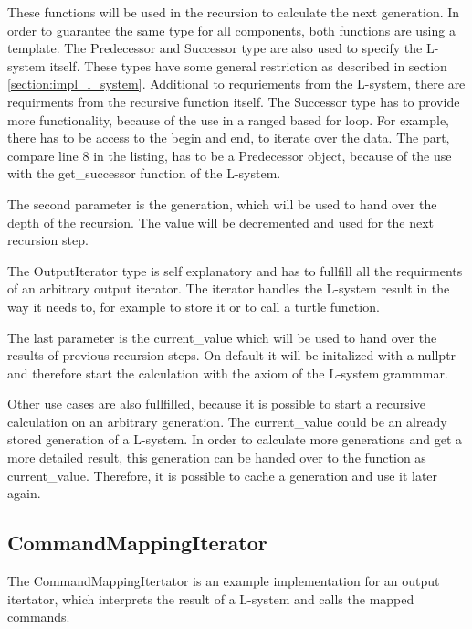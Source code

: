 \documentclass[english]{cpp-hmwk}
\begin{document}
\noindent These functions will be used in the recursion to calculate the next generation. In order to guarantee the same type for all components, both functions are using a template. The Predecessor and Successor type are also used to specify the L-system itself. These types have some general restriction as described in section \ref{section:impl_l_system}.\newline
Additional to requriements from the L-system, there are requirments from the recursive function itself.  The Successor type has to provide more functionality, because of the use in a ranged based for loop. For example, there has to be access to the begin and end, to iterate over the data. The part, compare line 8 in the listing, has to be a Predecessor object, because of the use with the get\_successor function of the L-system.

The second parameter is the generation, which will be used to hand over the depth of the recursion. The value will be decremented and used for the next recursion step.

The OutputIterator type is self explanatory and has to fullfill all the requirments of an arbitrary output iterator. The iterator handles the L-system result in the way it needs to, for example to store it or to call a turtle function.

The last parameter is the current\_value which will be used to hand over the results of previous recursion steps. On default it will be initalized with a nullptr and therefore start the calculation with the axiom of the L-system grammmar.

Other use cases are also fullfilled, because it is possible to start a recursive calculation on an arbitrary generation. The current\_value could be an already stored generation of a L-system. In order to calculate more generations and get a more detailed result, this generation can be handed over to the function as current\_value. Therefore, it is possible to cache a generation and use it later again.

\subsection{CommandMappingIterator}

The CommandMappingItertator is an example implementation for an output itertator, which interprets the result of a L-system and calls the mapped commands. 
\end{document}
